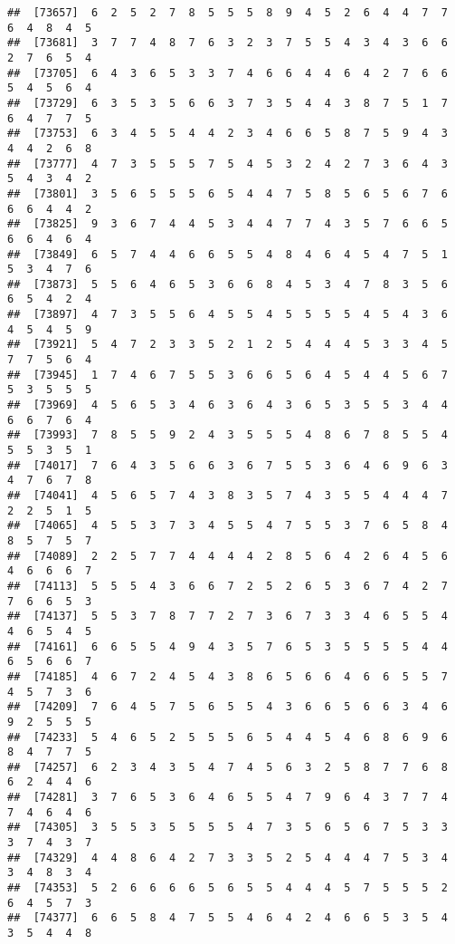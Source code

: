 \documentclass[
]{book}
\begin{document}
\begin{verbatim}
##  [73657]  6  2  5  2  7  8  5  5  5  8  9  4  5  2  6  4  4  7  7  6  4  8  4  5
##  [73681]  3  7  7  4  8  7  6  3  2  3  7  5  5  4  3  4  3  6  6  2  7  6  5  4
##  [73705]  6  4  3  6  5  3  3  7  4  6  6  4  4  6  4  2  7  6  6  5  4  5  6  4
##  [73729]  6  3  5  3  5  6  6  3  7  3  5  4  4  3  8  7  5  1  7  6  4  7  7  5
##  [73753]  6  3  4  5  5  4  4  2  3  4  6  6  5  8  7  5  9  4  3  4  4  2  6  8
##  [73777]  4  7  3  5  5  5  7  5  4  5  3  2  4  2  7  3  6  4  3  5  4  3  4  2
##  [73801]  3  5  6  5  5  5  6  5  4  4  7  5  8  5  6  5  6  7  6  6  6  4  4  2
##  [73825]  9  3  6  7  4  4  5  3  4  4  7  7  4  3  5  7  6  6  5  6  6  4  6  4
##  [73849]  6  5  7  4  4  6  6  5  5  4  8  4  6  4  5  4  7  5  1  5  3  4  7  6
##  [73873]  5  5  6  4  6  5  3  6  6  8  4  5  3  4  7  8  3  5  6  6  5  4  2  4
##  [73897]  4  7  3  5  5  6  4  5  5  4  5  5  5  5  4  5  4  3  6  4  5  4  5  9
##  [73921]  5  4  7  2  3  3  5  2  1  2  5  4  4  4  5  3  3  4  5  7  7  5  6  4
##  [73945]  1  7  4  6  7  5  5  3  6  6  5  6  4  5  4  4  5  6  7  5  3  5  5  5
##  [73969]  4  5  6  5  3  4  6  3  6  4  3  6  5  3  5  5  3  4  4  6  6  7  6  4
##  [73993]  7  8  5  5  9  2  4  3  5  5  5  4  8  6  7  8  5  5  4  5  5  3  5  1
##  [74017]  7  6  4  3  5  6  6  3  6  7  5  5  3  6  4  6  9  6  3  4  7  6  7  8
##  [74041]  4  5  6  5  7  4  3  8  3  5  7  4  3  5  5  4  4  4  7  2  2  5  1  5
##  [74065]  4  5  5  3  7  3  4  5  5  4  7  5  5  3  7  6  5  8  4  8  5  7  5  7
##  [74089]  2  2  5  7  7  4  4  4  4  2  8  5  6  4  2  6  4  5  6  4  6  6  6  7
##  [74113]  5  5  5  4  3  6  6  7  2  5  2  6  5  3  6  7  4  2  7  7  6  6  5  3
##  [74137]  5  5  3  7  8  7  7  2  7  3  6  7  3  3  4  6  5  5  4  4  6  5  4  5
##  [74161]  6  6  5  5  4  9  4  3  5  7  6  5  3  5  5  5  5  4  4  6  5  6  6  7
##  [74185]  4  6  7  2  4  5  4  3  8  6  5  6  6  4  6  6  5  5  7  4  5  7  3  6
##  [74209]  7  6  4  5  7  5  6  5  5  4  3  6  6  5  6  6  3  4  6  9  2  5  5  5
##  [74233]  5  4  6  5  2  5  5  5  6  5  4  4  5  4  6  8  6  9  6  8  4  7  7  5
##  [74257]  6  2  3  4  3  5  4  7  4  5  6  3  2  5  8  7  7  6  8  6  2  4  4  6
##  [74281]  3  7  6  5  3  6  4  6  5  5  4  7  9  6  4  3  7  7  4  7  4  6  4  6
##  [74305]  3  5  5  3  5  5  5  5  4  7  3  5  6  5  6  7  5  3  3  3  7  4  3  7
##  [74329]  4  4  8  6  4  2  7  3  3  5  2  5  4  4  4  7  5  3  4  3  4  8  3  4
##  [74353]  5  2  6  6  6  6  5  6  5  5  4  4  4  5  7  5  5  5  2  6  4  5  7  3
##  [74377]  6  6  5  8  4  7  5  5  4  6  4  2  4  6  6  5  3  5  4  3  5  4  4  8

\end{verbatim}
\end{document}
